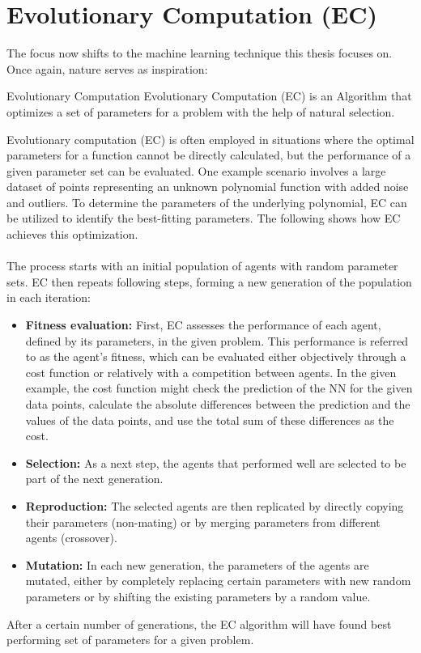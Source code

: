 \section{Evolutionary Computation (EC)}\label{sec:evolutionary-computation-(ec)-&-genetic-algorithms-(gas)}
The focus now shifts to the machine learning technique this thesis focuses on.
Once again, nature serves as inspiration:
\begin{mydef}{Evolutionary Computation}
    Evolutionary Computation (EC) is an Algorithm that optimizes a set of parameters for a problem with the help of natural selection.\cite{virtusa2024}
\end{mydef}
Evolutionary computation (EC) is often employed in situations where the optimal parameters for a function cannot be directly calculated, but the performance of a given parameter set can be evaluated.
One example scenario involves a large dataset of points representing an unknown polynomial function with added noise and outliers.
To determine the parameters of the underlying polynomial, EC can be utilized to identify the best-fitting parameters.
The following shows how EC achieves this optimization.
\\ \\
The process starts with an initial population of agents with random parameter sets.
EC then repeats following steps, forming a new generation of the population in each iteration\cite{Sathyabama20}:
\begin{itemize}
    \item \textbf{Fitness evaluation:} First, EC assesses the performance of each agent, defined by its parameters, in the given problem.
    This performance is referred to as the agent's fitness, which can be evaluated either objectively through a cost function or relatively with a competition between agents.
    In the given example, the cost function might check the prediction of the NN for the given data points, calculate the absolute differences between the prediction and the values of the data points, and use the total sum of these differences as the cost.
    \item \textbf{Selection:} As a next step, the agents that performed well are selected to be part of the next generation.
    \item \textbf{Reproduction:} The selected agents are then replicated by directly copying their parameters (non-mating) or by merging parameters from different agents (crossover).
    \item \textbf{Mutation:} In each new generation, the parameters of the agents are mutated, either by completely replacing certain parameters with new random parameters or by shifting the existing parameters by a random value.
\end{itemize}
After a certain number of generations, the EC algorithm will have found best performing set of parameters for a given problem.

